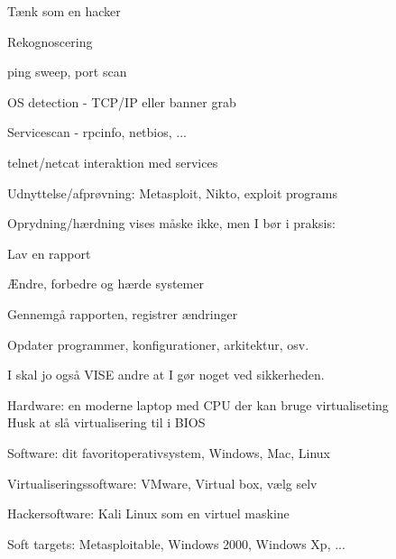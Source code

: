 \documentclass[20pt,landscape,a4paper,footrule]{foils}
\begin{document}
\begin{list1}
\item Tænk som en hacker
\item Rekognoscering
\begin{list2}
\item ping sweep, port scan
\item OS detection - TCP/IP eller banner grab
\item Servicescan - rpcinfo, netbios, ...
\item telnet/netcat interaktion med services
\end{list2}
\item Udnyttelse/afprøvning: Metasploit, Nikto, exploit programs
\item Oprydning/hærdning vises måske ikke, men I bør i praksis:
\begin{list2}
\item Lav en rapport
\item Ændre, forbedre og hærde systemer
\item Gennemgå rapporten, registrer ændringer
\item Opdater programmer, konfigurationer, arkitektur, osv. 
\end{list2}
\item I skal jo også VISE andre at I gør noget ved sikkerheden.
\end{list1}




\begin{list2}
\item Hardware: en moderne laptop med CPU der kan bruge virtualiseting\\
Husk at slå virtualisering til i BIOS
\item Software: dit favoritoperativsystem, Windows, Mac, Linux
\item Virtualiseringssoftware: VMware, Virtual box, vælg selv
\item Hackersoftware: Kali Linux som en virtuel maskine
\item Soft targets: Metasploitable, Windows 2000, Windows Xp, ...
\end{list2}







\end{document}
